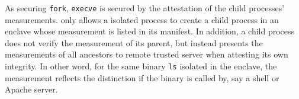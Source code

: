As securing {\tt fork}, {\tt execve} is secured by the attestation of
the child processes' measurements.
\sysname{} only allows a isolated process to create a child process
in an enclave whose measurement is listed in its manifest.
In addition, a child process does not verify the measurement of its parent,
but instead presents the measurements of all ancestors
to remote trusted server when attesting its own integrity.
In other word, for the same binary {\tt ls} isolated in the enclave,
the measurement reflects the distinction if the binary is called by,
say a shell or Apache server.


%
%



